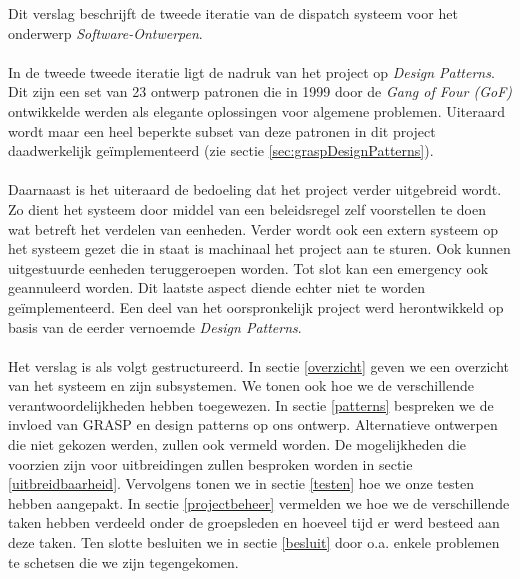 Dit verslag beschrijft de tweede iteratie van de dispatch systeem voor het onderwerp \textit{Software-Ontwerpen}.
\paragraph{}
In de tweede tweede iteratie ligt de nadruk van het project op \textit{Design Patterns}. Dit zijn een set van 23 ontwerp patronen die in 1999 door de \textit{Gang of Four (GoF)} ontwikkelde werden als elegante oplossingen voor algemene problemen. Uiteraard wordt maar een heel beperkte subset van deze patronen in dit project daadwerkelijk ge\"implementeerd (zie sectie \ref{sec:graspDesignPatterns}).
\paragraph{}
Daarnaast is het uiteraard de bedoeling dat het project verder uitgebreid wordt. Zo dient het systeem door middel van een beleidsregel zelf voorstellen te doen wat betreft het verdelen van eenheden. Verder wordt ook een extern systeem op het systeem gezet die in staat is machinaal het project aan te sturen. Ook kunnen uitgestuurde eenheden teruggeroepen worden. Tot slot kan een emergency ook geannuleerd worden. Dit laatste aspect diende echter niet te worden ge\"implementeerd.
Een deel van het oorspronkelijk project werd herontwikkeld op basis van de eerder vernoemde \textit{Design Patterns}.
\paragraph{}
Het verslag is als volgt gestructureerd. In sectie \ref{overzicht} geven we een overzicht van het systeem en zijn subsystemen.
We tonen ook hoe we de verschillende verantwoordelijkheden hebben toegewezen.
In sectie \ref{patterns} bespreken we de invloed van GRASP en design patterns op ons ontwerp.
Alternatieve ontwerpen die niet gekozen werden, zullen ook vermeld worden.
De mogelijkheden die voorzien zijn voor uitbreidingen zullen besproken worden in sectie \ref{uitbreidbaarheid}.
Vervolgens tonen we in sectie \ref{testen} hoe we onze testen hebben aangepakt.
In sectie \ref{projectbeheer} vermelden we hoe we de verschillende taken hebben verdeeld onder de groepsleden
en hoeveel tijd er werd besteed aan deze taken.
Ten slotte besluiten we in sectie \ref{besluit} door o.a. enkele problemen te schetsen die we zijn tegengekomen.
